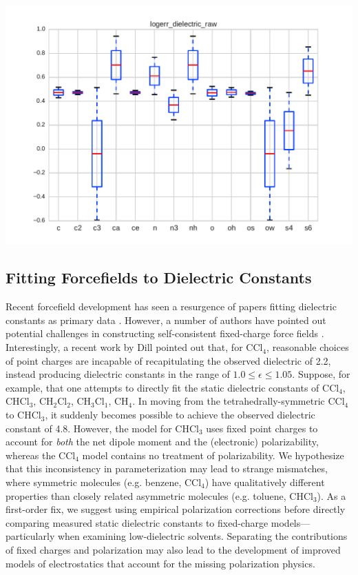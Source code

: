 \documentclass[journal=jacsat,manuscript=article]{achemso}
\begin{document}
\includegraphics[width=\columnwidth]{./figures/functional_group_logerr_dielectric_raw.pdf}

\subsection{Fitting Forcefields to Dielectric Constants}

Recent forcefield development has seen a resurgence of papers fitting dielectric constants as primary data \cite{wang2014building, fennell2014fixed}.  However, a number of authors have pointed out potential challenges in constructing self-consistent fixed-charge force fields \cite{fennell2012simple, leontyev2014polarizable}.  Interestingly, a recent work by Dill \cite{fennell2012simple} pointed out that, for $\mathrm{CCl_4}$, reasonable choices of point charges are incapable of recapitulating the observed dielectric of 2.2, instead producing dielectric constants in the range of $1.0 \le \epsilon \le 1.05$.  Suppose, for example, that one attempts to directly fit the static dielectric constants of $\mathrm{CCl_4}$, $\mathrm{CHCl_3}$, $\mathrm{CH_2Cl_2}$, $\mathrm{CH_3Cl_1}$, $\mathrm{CH_4}$.  In moving from the tetrahedrally-symmetric $\mathrm{CCl_4}$ to $\mathrm{CHCl_3}$, it suddenly becomes possible to achieve the observed dielectric constant of 4.8.  However, the model for $\mathrm{CHCl_3}$ uses fixed point charges to account for \emph{both} the net dipole moment and the (electronic) polarizability, whereas the $\mathrm{CCl_4}$ model contains no treatment of polarizability.  We hypothesize that this inconsistency in parameterization may lead to strange mismatches, where symmetric molecules (e.g. benzene, $\mathrm{CCl_4}$) have qualitatively different properties than closely related asymmetric molecules (e.g. toluene, $\mathrm{CHCl_3}$).  As a first-order fix, we suggest using empirical polarization corrections before directly comparing measured static dielectric constants to fixed-charge models---particularly when examining low-dielectric solvents.  Separating the contributions of fixed charges and polarization may also lead to the development of improved models of electrostatics that account for the missing polarization physics.
\end{document}
